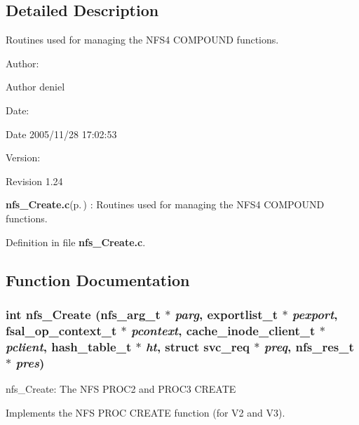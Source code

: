 \subsection{Detailed Description}
Routines used for managing the NFS4 COMPOUND functions. 

\begin{Desc}
\item[Author:]\begin{Desc}
\item[Author]deniel \end{Desc}
\end{Desc}
\begin{Desc}
\item[Date:]\begin{Desc}
\item[Date]2005/11/28 17:02:53 \end{Desc}
\end{Desc}
\begin{Desc}
\item[Version:]\begin{Desc}
\item[Revision]1.24 \end{Desc}
\end{Desc}
{\bf nfs\_\-Create.c}{\rm (p.\,\pageref{nfs__Create_8c})} : Routines used for managing the NFS4 COMPOUND functions.

Definition in file {\bf nfs\_\-Create.c}.

\subsection{Function Documentation}
\subsubsection{\setlength{\rightskip}{0pt plus 5cm}int nfs\_\-Create (nfs\_\-arg\_\-t $\ast$ {\em parg}, exportlist\_\-t $\ast$ {\em pexport}, fsal\_\-op\_\-context\_\-t $\ast$ {\em pcontext}, cache\_\-inode\_\-client\_\-t $\ast$ {\em pclient}, hash\_\-table\_\-t $\ast$ {\em ht}, struct svc\_\-req $\ast$ {\em preq}, nfs\_\-res\_\-t $\ast$ {\em pres})}\label{nfs__Create_8c_a0}


nfs\_\-Create: The NFS PROC2 and PROC3 CREATE

Implements the NFS PROC CREATE function (for V2 and V3).

